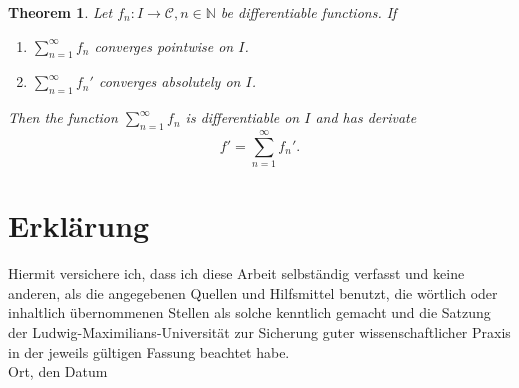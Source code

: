\documentclass[12pt,a4paper]{scrartcl}
\newtheorem{theorem}{Theorem}[section]
\numberwithin{equation}{section}
\newcommand{\N}{\mathbb{N}} %
\begin{document}
\begin{theorem} \label{th:sumdifferentiation}
Let $f_n:I \rightarrow \mathcal{C} , n \in \N$ be differentiable functions. If
\begin{enumerate}
\item $\sum_{n=1}^{\infty} f_n $ converges pointwise on $I$.
\item $\sum_{n=1}^{\infty} f_n' $ converges absolutely on $I$.
\end{enumerate}
Then the function $\sum_{n=1}^{\infty} f_n$ is differentiable on $I$ and has derivate
$$ f' = \sum_{n=1}^{\infty} f_n'. $$
\end{theorem}




  \newpage

{}
    


      

\newpage
  
 \thispagestyle{empty}


\vspace*{8cm}


\section*{Erklärung}

Hiermit versichere ich, dass ich diese Arbeit selbständig verfasst und keine anderen, als die angegebenen Quellen und Hilfsmittel benutzt, die wörtlich oder inhaltlich übernommenen Stellen als solche kenntlich gemacht und die Satzung der Ludwig-Maximilians-Universität zur Sicherung guter wissenschaftlicher Praxis in der jeweils gültigen Fassung beachtet habe. \\[2ex] 

\noindent
Ort, den Datum\\[5ex]

\end{document}
